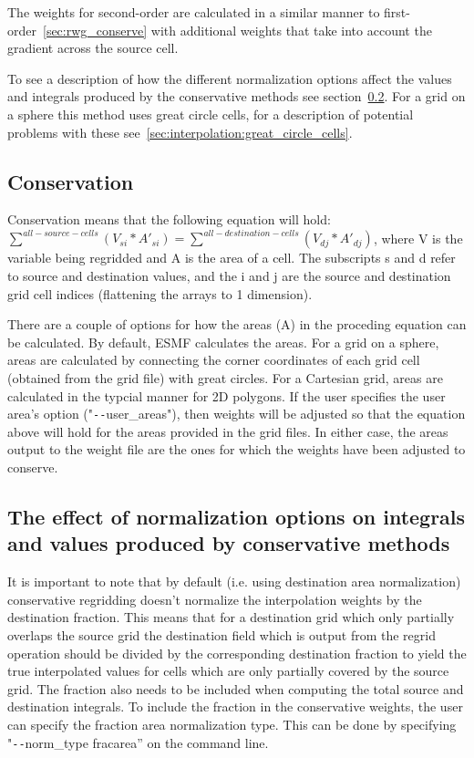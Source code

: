   The weights for second-order are calculated in a similar manner to first-order~\ref{sec:rwg_conserve} with additional weights that take into account the gradient across the source cell. 

To see a description of how the different normalization options affect the values and integrals produced by the conservative methods see section~\ref{sec:rwg:conservative_norm_opts}. For a grid on a sphere this method uses great circle cells, for a description of potential problems with these see~\ref{sec:interpolation:great_circle_cells}.

\subsection{Conservation}\label{sec:rwg:conservation}
 Conservation means that the following equation will hold:
  $\sum^{all-source-cells}(V_{si}*A'_{si}) = \sum^{all-destination-cells}(V_{dj}*A'_{dj})$, where
 V is the variable being regridded and A is the area of a cell.  
 The subscripts s and d refer to source and destination values, and the i and j are the source
 and destination grid cell indices (flattening the arrays to 1 dimension). 

 There are a couple of options for how the areas (A) in the proceding equation can be calculated. By default, ESMF calculates the areas. For a grid on a sphere, 
areas are calculated by connecting the corner coordinates of each grid cell (obtained from the grid file) with great circles. For a Cartesian grid, areas are calculated
in the typcial manner for 2D polygons. If the user specifies the user area's option ("\verb+--+user\_areas"), then weights will be adjusted so that the equation above 
will hold for the areas provided in the grid files. In either case, the areas output to the weight file are the ones for which the weights have been adjusted to conserve.

\subsection{The effect of normalization options on integrals and values produced by conservative methods}\label{sec:rwg:conservative_norm_opts}
 It is important to note that by default (i.e. using destination area normalization) conservative regridding doesn't normalize the interpolation weights by the destination fraction. This means that for a destination grid which only partially overlaps the source grid the destination field which is output from the regrid operation should be divided by the corresponding destination fraction to yield the true interpolated values for cells which are only partially covered by the source grid.
The fraction also needs to be included when computing the total source and destination integrals. To include the fraction in the conservative weights, the user can specify the fraction area normalization type. This can be done by specifying "\verb+--+norm\_type fracarea'' on the command line. 

